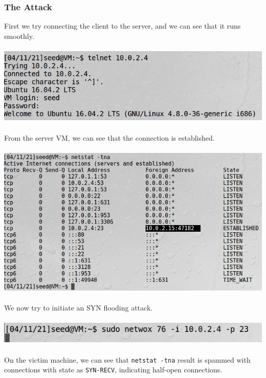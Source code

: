 \documentclass[a4paper]{article}
\begin{document}
\subsubsection{The Attack}
First we try connecting the client to the server, and we can see that it runs smoothly.\\\\
\includegraphics[scale=0.7]{1/4.png}\\\\
From the server VM, we can see that the connection is established.\\\\
\includegraphics[scale=0.7]{1/5.png}\\\\
We now try to initiate an SYN flooding attack.\\\\
\includegraphics[scale=0.7]{1/6.png}\\\\
On the victim machine, we can see that \verb+netstat -tna+ result is spammed with connections with state as \verb+SYN-RECV+, indicating half-open connections.\\\\
\pagebreak
\end{document}
